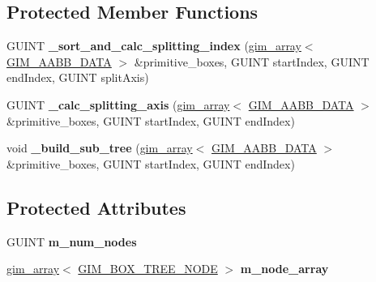 \subsection*{Protected Member Functions}
\begin{DoxyCompactItemize}
\item 
\hypertarget{class_g_i_m___b_o_x___t_r_e_e_ac9f0e8f8b9b1998bf126001afbd372c9}{G\+U\+I\+N\+T {\bfseries \+\_\+sort\+\_\+and\+\_\+calc\+\_\+splitting\+\_\+index} (\hyperlink{classgim__array}{gim\+\_\+array}$<$ \hyperlink{struct_g_i_m___a_a_b_b___d_a_t_a}{G\+I\+M\+\_\+\+A\+A\+B\+B\+\_\+\+D\+A\+T\+A} $>$ \&primitive\+\_\+boxes, G\+U\+I\+N\+T start\+Index, G\+U\+I\+N\+T end\+Index, G\+U\+I\+N\+T split\+Axis)}\label{class_g_i_m___b_o_x___t_r_e_e_ac9f0e8f8b9b1998bf126001afbd372c9}

\item 
\hypertarget{class_g_i_m___b_o_x___t_r_e_e_a36da9ee25d328a3ebd9696c3e3ce8973}{G\+U\+I\+N\+T {\bfseries \+\_\+calc\+\_\+splitting\+\_\+axis} (\hyperlink{classgim__array}{gim\+\_\+array}$<$ \hyperlink{struct_g_i_m___a_a_b_b___d_a_t_a}{G\+I\+M\+\_\+\+A\+A\+B\+B\+\_\+\+D\+A\+T\+A} $>$ \&primitive\+\_\+boxes, G\+U\+I\+N\+T start\+Index, G\+U\+I\+N\+T end\+Index)}\label{class_g_i_m___b_o_x___t_r_e_e_a36da9ee25d328a3ebd9696c3e3ce8973}

\item 
\hypertarget{class_g_i_m___b_o_x___t_r_e_e_af1432fe0768138ad9749b8f45cea7a47}{void {\bfseries \+\_\+build\+\_\+sub\+\_\+tree} (\hyperlink{classgim__array}{gim\+\_\+array}$<$ \hyperlink{struct_g_i_m___a_a_b_b___d_a_t_a}{G\+I\+M\+\_\+\+A\+A\+B\+B\+\_\+\+D\+A\+T\+A} $>$ \&primitive\+\_\+boxes, G\+U\+I\+N\+T start\+Index, G\+U\+I\+N\+T end\+Index)}\label{class_g_i_m___b_o_x___t_r_e_e_af1432fe0768138ad9749b8f45cea7a47}

\end{DoxyCompactItemize}
\subsection*{Protected Attributes}
\begin{DoxyCompactItemize}
\item 
\hypertarget{class_g_i_m___b_o_x___t_r_e_e_ad175db1b709c3fd9835ce8423af847fd}{G\+U\+I\+N\+T {\bfseries m\+\_\+num\+\_\+nodes}}\label{class_g_i_m___b_o_x___t_r_e_e_ad175db1b709c3fd9835ce8423af847fd}

\item 
\hypertarget{class_g_i_m___b_o_x___t_r_e_e_a6dd738f6725e3595eaf9f2fa73615868}{\hyperlink{classgim__array}{gim\+\_\+array}$<$ \hyperlink{struct_g_i_m___b_o_x___t_r_e_e___n_o_d_e}{G\+I\+M\+\_\+\+B\+O\+X\+\_\+\+T\+R\+E\+E\+\_\+\+N\+O\+D\+E} $>$ {\bfseries m\+\_\+node\+\_\+array}}\label{class_g_i_m___b_o_x___t_r_e_e_a6dd738f6725e3595eaf9f2fa73615868}

\end{DoxyCompactItemize}


